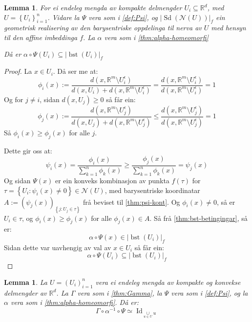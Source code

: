 \documentclass[a4paper, 12pt, norsk]{article}
\theoremstyle{plain}
\newtheorem{lemma}[theorem]{Lemma}
\theoremstyle{definition}
\newcommand{\Rb}{\mathbb{R}}
\newcommand{\Nc}{\mathcal{N}}
\newcommand{\union}{ \mathop{\cup}\limits }
\newcommand{\gr}[1]{ \lvert #1 \rvert } %
\newcommand{\set}[1]{ \left \{ #1 \right \} } %
\newcommand{\tuple}[1]{ \left( #1 \right) } %
\DeclareMathOperator{\Sd}{Sd}
\DeclareMathOperator{\bst}{bst}
\DeclareMathOperator{\Id}{Id}
\begin{document}
\begin{lemma} \label{thm:Psi-inni-bst}
	For ei endeleg mengda av kompakte delmengder \( U_i \subseteq \Rb^d \), med \( U = \set{U_i}_{i=1}^n \). Vidare la \( \Psi \) vera som i \autoref{def:Psi}, og \( \gr{\Sd(\Nc(U))}_f \) ein geometrisk realisering av den barysentriske oppdelinga til nerva av \( U \) med hensyn til den affine imbeddinga \( f \). La \( \alpha \) vera som i \autoref{thm:alpha-homeomorfi}

	Då er \( \alpha \circ \Psi(U_i) \subseteq \gr{\bst(U_i)}_f \)
\end{lemma}

\begin{proof}
	La \( x \in U_i \). Då ser me at:
	\[
		\phi_i(x) := \frac{d(x, \Rb^m \setminus U_i^\epsilon)}{d(x, U_i) + d(x, \Rb^m \setminus U_i^\epsilon)} = \frac{d(x, \Rb^m \setminus U_i^\epsilon)}{d(x, \Rb^m \setminus U_i^\epsilon)} = 1
	\] 
	Og for \( j \neq i \), sidan \( d(x, U_j) \geq 0 \) så får ein:
	\[
		\phi_j(x) := \frac{d(x, \Rb^m \setminus U_j^\epsilon)}{d(x, U_j) + d(x, \Rb^m \setminus U_j^\epsilon)} \leq \frac{d(x, \Rb^m \setminus U_j^\epsilon)}{d(x, \Rb^m \setminus U_j^\epsilon)} = 1
	\]
	Så \( \phi_i(x) \geq \phi_j(x) \) for alle \( j \).

	Dette gir oss at:
	\[
		\psi_i(x) = \frac{\phi_i(x)}{\sum_{k=1}^n \phi_k(x)} \geq \frac{\phi_j(x)}{\sum_{k=1}^n \phi_k(x)} = \psi_j(x)
	\]
	Og sidan \( \Psi(x) \) er ein konveks kombinasjon av punkta \( f(\tau) \) for \( \tau = \set{U_i : \psi_i(x) \neq 0} \in \Nc(U) \), med barysentriske koordinatar \( A:= \tuple{\psi_j(x)}_{\set{ j : U_j\in \tau}} \) frå beviset til \autoref{thm:psi-kont}. Og \( \phi_i(x) \neq 0 \), så er \( U_i \in \tau \), og \( \phi_i(x) \geq \phi_j(x) \) for alle \( \phi_j(x) \in A \). Så frå \autoref{thm:bst-betingingar}, så er:
	\[
		\alpha \circ \Psi(x) \in \gr{\bst(U_i)}_f
	\]
	Sidan dette var uavhengig av val av \( x \in U_i \) så får ein:
	\[
		\alpha \circ \Psi(U_i) \subseteq \gr{\bst(U_i)}_f
	\]
\end{proof}

\begin{lemma} \label{thm:homeq-u}
	La \( U = \tuple{U_i}_{i=1}^n \) vera ei endeleg mengda av kompakte og konvekse delmengder av \( \Rb^d \). La \( \Gamma \) vera som i \autoref{thm:Gamma}, la \( \Psi \) vera som i \autoref{def:Psi}, og la \( \alpha \) vera som i \autoref{thm:alpha-homeomorfi}. Då er:
	\[
		\Gamma \circ \alpha^{-1} \circ \Psi \simeq \Id_{\union_{u \in U} u} 
	\]
\end{lemma}
\end{document}
